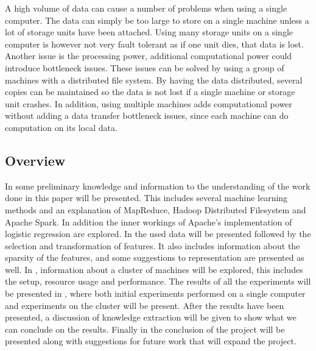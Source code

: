 A high volume of data can cause a number of problems when using a single computer. The data can simply be too large to store on a single machine unless a lot of storage units have been attached. Using many storage units on a single computer is however not very fault tolerant as if one unit dies, that data is lost. Another issue is the processing power, additional computational power could introduce bottleneck issues. These issues can be solved by using a group of machines with a distributed file system. By having the data distributed, several copies can be maintained so the data is not lost if a single machine or storage unit crashes. In addition, using multiple machines adds computational power without adding a data transfer bottleneck issues, since each machine can do computation on its local data.

\subsection{Overview}\label{sec:overview}
In  some preliminary knowledge and information to the understanding of the work done in this paper will be presented. This includes several machine learning methods and an explanation of MapReduce, Hadoop Distributed Filesystem and Apache Spark. In addition the inner workings of Apache's implementation of logistic regression are explored. 
In  the used data will be presented followed by the selection and transformation of features. It also includes information about the sparsity of the features, and some suggestions to representation are presented as well.  
In , information about a cluster of machines will be explored, this includes the setup, resource usage and performance. 
The results of all the experiments will be presented in , where both initial experiments performed on a single computer and experiments on the cluster will be present. After the results have been presented, a discussion of knowledge extraction will be given to show what we can conclude on the results. 
Finally in  the conclusion of the project will be presented along with suggestions for future work that will expand the project.



